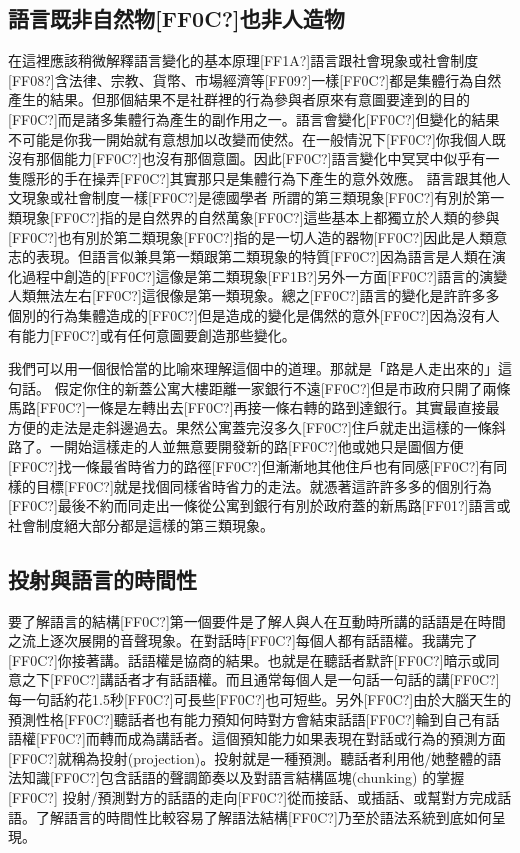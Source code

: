 \subsection{語言既非自然物[FF0C?]也非人造物} %

在這裡應該稍微解釋語言變化的基本原理[FF1A?]語言跟社會現象或社會制度[FF08?]含法律、宗教、貨幣、市場經濟等[FF09?]一樣[FF0C?]都是集體行為自然產生的結果。但那個結果不是社群裡的行為參與者原來有意圖要達到的目的[FF0C?]而是諸多集體行為產生的副作用之一。語言會變化[FF0C?]但變化的結果不可能是你我一開始就有意想加以改變而使然。在一般情況下[FF0C?]你我個人既沒有那個能力[FF0C?]也沒有那個意圖。因此[FF0C?]語言變化中冥冥中似乎有一隻隱形的手在操弄[FF0C?]其實那只是集體行為下產生的意外效應。 語言跟其他人文現象或社會制度一樣[FF0C?]是德國學者\parencite{Keller1994} 所謂的第三類現象[FF0C?]有別於第一類現象[FF0C?]指的是自然界的自然萬象[FF0C?]這些基本上都獨立於人類的參與[FF0C?]也有別於第二類現象[FF0C?]指的是一切人造的器物[FF0C?]因此是人類意志的表現。但語言似兼具第一類跟第二類現象的特質[FF0C?]因為語言是人類在演化過程中創造的[FF0C?]這像是第二類現象[FF1B?]另外一方面[FF0C?]語言的演變人類無法左右[FF0C?]這很像是第一類現象。總之[FF0C?]語言的變化是許許多多個別的行為集體造成的[FF0C?]但是造成的變化是偶然的意外[FF0C?]因為沒有人有能力[FF0C?]或有任何意圖要創造那些變化。     

我們可以用一個很恰當的比喻來理解這個中的道理。那就是「路是人走出來的」這句話。 假定你住的新蓋公寓大樓距離一家銀行不遠[FF0C?]但是市政府只開了兩條馬路[FF0C?]一條是左轉出去[FF0C?]再接一條右轉的路到達銀行。其實最直接最方便的走法是走斜邊過去。果然公寓蓋完沒多久[FF0C?]住戶就走出這樣的一條斜路了。一開始這樣走的人並無意要開發新的路[FF0C?]他或她只是圖個方便[FF0C?]找一條最省時省力的路徑[FF0C?]但漸漸地其他住戶也有同感[FF0C?]有同樣的目標[FF0C?]就是找個同樣省時省力的走法。就憑著這許許多多的個別行為[FF0C?]最後不約而同走出一條從公寓到銀行有別於政府蓋的新馬路[FF01?]語言或社會制度絕大部分都是這樣的第三類現象。

\subsection{投射與語言的時間性} %

要了解語言的結構[FF0C?]第一個要件是了解人與人在互動時所講的話語是在時間之流上逐次展開的音聲現象。在對話時[FF0C?]每個人都有話語權。我講完了[FF0C?]你接著講。話語權是協商的結果。也就是在聽話者默許[FF0C?]暗示或同意之下[FF0C?]講話者才有話語權。而且通常每個人是一句話一句話的講[FF0C?]每一句話約花1.5秒[FF0C?]可長些[FF0C?]也可短些。另外[FF0C?]由於大腦天生的預測性格[FF0C?]聽話者也有能力預知何時對方會結束話語[FF0C?]輪到自己有話語權[FF0C?]而轉而成為講話者。這個預知能力如果表現在對話或行為的預測方面[FF0C?]就稱為投射(projection)。投射就是一種預測。聽話者利用他/她整體的語法知識[FF0C?]包含話語的聲調節奏以及對語言結構區塊(chunking) 的掌握[FF0C?] 投射/預測對方的話語的走向[FF0C?]從而接話、或插話、或幫對方完成話語。了解語言的時間性比較容易了解語法結構[FF0C?]乃至於語法系統到底如何呈現。

